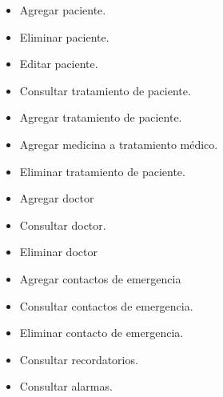 \begin{itemize}
\begin{itemize}
		
		\item Agregar paciente.
		\item Eliminar paciente.
		\item Editar paciente.
		\item Consultar tratamiento de paciente.
		\item Agregar tratamiento de paciente.
		\item Agregar medicina a tratamiento médico.
		\item Eliminar tratamiento de paciente.
		\item Agregar doctor
		\item Consultar doctor.
		\item Eliminar doctor
		\item Agregar contactos de emergencia
		\item Consultar contactos de emergencia.
		\item Eliminar contacto de emergencia.
		\item Consultar recordatorios.
		\item Consultar alarmas.
%		
	\end{itemize}
\end{itemize}


